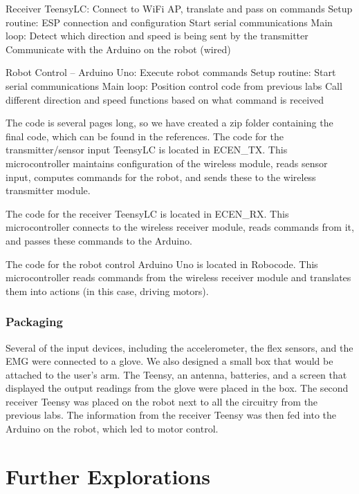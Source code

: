 \documentclass[12pt,scrartcl,titlepage]{article}
\begin{document}
Receiver TeensyLC: Connect to WiFi AP, translate and pass on commands
    Setup routine:
ESP connection and configuration
Start serial communications
    Main loop:
Detect which direction and speed is being sent by the transmitter
Communicate with the Arduino on the robot (wired)

Robot Control – Arduino Uno: Execute robot commands
    Setup routine:
Start serial communications
    Main loop:
Position control code from previous labs
Call different direction and speed functions based on what command is received

The code is several pages long, so we have created a zip folder containing the final code, which can be found in the references. The code for the transmitter/sensor input TeensyLC is located in ECEN\_TX. This microcontroller maintains configuration of the wireless module, reads sensor input, computes commands for the robot, and sends these to the wireless transmitter module.

The code for the receiver TeensyLC is located in ECEN\_RX. This microcontroller connects to the wireless receiver module, reads commands from it, and passes these commands to the Arduino.

The code for the robot control Arduino Uno is located in Robocode. This microcontroller reads commands from the wireless receiver module and translates them into actions (in this case, driving motors).
  
  \subsubsection{Packaging}

  Several of the input devices, including the accelerometer, the flex sensors, and the EMG were connected to a glove. We also designed a small box that would be attached to the user’s arm. The Teensy, an antenna, batteries, and a screen that displayed the output readings from the glove were placed in the box. The second receiver Teensy was placed on the robot next to all the circuitry from the previous labs. The information from the receiver Teensy was then fed into the Arduino on the robot, which led to motor control.
  
\section{Further Explorations}
\end{document}
